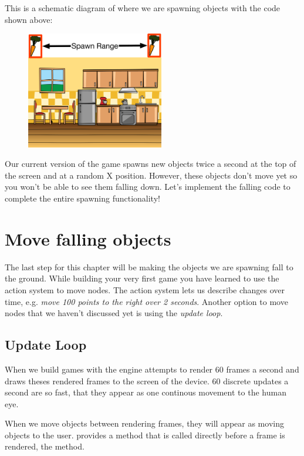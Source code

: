 This is a schematic diagram of where we are spawning
objects with the code shown above:

\begin{figure}[H]
		\centering
		\includegraphics[width=170pt]{images/Chapter2/SpawnObjects.png}
\end{figure}

Our current version of the game spawns new objects twice a second at the top of
the screen and at a random X position. However, these objects don't move yet so
you won't be able to see them falling down. Let's implement the falling code to
complete the entire spawning functionality!

\section{Move falling objects}
The last step for this chapter will be making the objects we are spawning fall
to the ground. While building your very first \SB{} game you have learned to use
the \cocos{} action system to move nodes. The action system lets us describe changes over time, e.g. \textit{move 100 points to the right over 2
seconds}. Another option to move nodes that we haven't
discussed yet is using the \cocos{} \textit{update loop}.

\subsection{Update Loop}
When we build games with \cocos{} the engine attempts to render 60 frames a
second and draws theses rendered frames to the screen of the device. 60 discrete
updates a second are so fast, that they appear as one continous movement to the
human eye. 

When we move objects between rendering frames, they will appear as
moving objects to the user. \cocos{} provides a method that is called directly before a frame is rendered, the  method.

